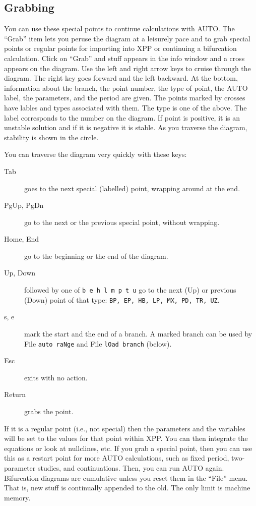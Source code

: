 \documentclass{article}
\begin{document}
\subsection{Grabbing}

You can use these special points to continue calculations with AUTO.
The ``Grab'' item lets you peruse the diagram at a leisurely pace and
to grab special points or regular points for importing into XPP or
continuing a bifurcation calculation.  Click on ``Grab'' and stuff
appears in the info window and a cross appears on the diagram.  Use
the left and right arrow keys to cruise through the diagram. The right
key goes forward and the left backward.  At the bottom, information
about the branch, the point number, the type of point, the AUTO label,
the parameters, and the period are given. The points marked by crosses
have lables and types associated with them.  The type is one of the
above.  The label corresponds to the number on the diagram.  If point
is positive, it is an unstable solution and if it is negative it is
stable. As you traverse the diagram, stability is shown in the circle.

You can traverse the diagram very quickly with these keys:
\begin{description}
\item[Tab] goes to the next special (labelled) point, wrapping around at the end.
\item[PgUp, PgDn] go to the next or the previous special point, without wrapping.
\item[Home, End] go to the beginning or the end of the diagram.
\item[Up, Down] followed by one of {\tt b e h l m p t u} go to the next
(Up) or previous (Down) point of that type: {\tt BP, EP, HB, LP, MX, PD, TR, UZ}.
\item[s, e] mark the start and the end of a branch.  A marked branch can be
used by File {\tt auto raNge} and File {\tt lOad branch} (below).
\item[Esc] exits with no action.
\item[Return] grabs the point.
\end{description}
If it is a regular
point (i.e., not special) then the parameters and the variables will
be set to the values for that point within XPP.  You can then
integrate the equations or look at nullclines, etc.  If you grab a
special point, then you can use this as a restart point for more AUTO
calculations, such as fixed period, two-parameter studies, and
continuations. Then, you can run AUTO again.  Bifurcation diagrams are
cumulative unless you reset them in the ``File'' menu.  That is, new
stuff is continually appended to the old.  The only limit is machine
memory.
\end{document}

